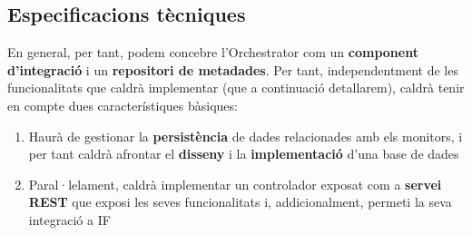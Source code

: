 \subsection{Especificacions tècniques}

En general, per tant, podem concebre l'Orchestrator com un \textbf{component d'integració} i un \textbf{repositori de metadades}. Per tant, independentment de les funcionalitats que caldrà implementar (que a continuació detallarem), caldrà tenir en compte dues característiques bàsiques:

\begin{enumerate}
\item Haurà de gestionar la \textbf{persistència} de dades relacionades amb els monitors, i per tant caldrà afrontar el \textbf{disseny} i la \textbf{implementació} d'una base de dades 
\item Paral·lelament, caldrà implementar un controlador exposat com a \textbf{servei REST} que exposi les seves funcionalitats i, addicionalment, permeti la seva integració a IF
\end{enumerate}



